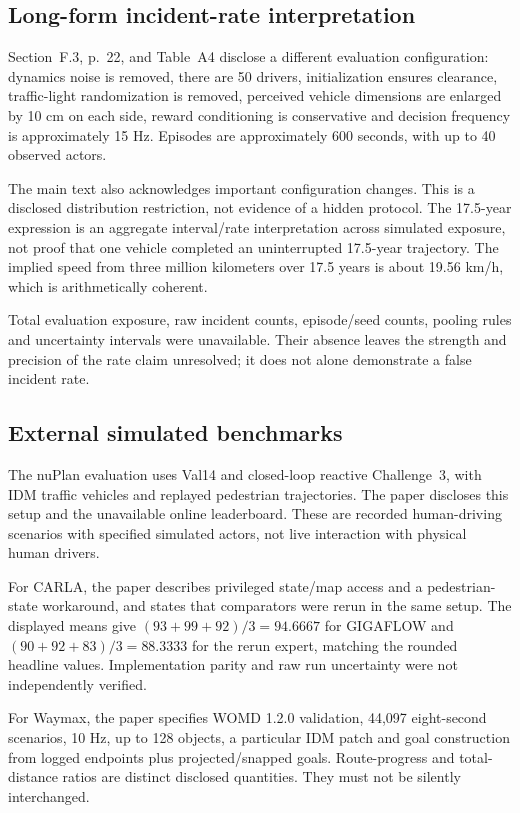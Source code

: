 \documentclass[10pt]{article}
\begin{document}
\subsection*{Long-form incident-rate interpretation}
Section F.3, p. 22, and Table A4 disclose a different evaluation configuration: dynamics noise is removed, there are 50 drivers, initialization ensures clearance, traffic-light randomization is removed, perceived vehicle dimensions are enlarged by 10 cm on each side, reward conditioning is conservative and decision frequency is approximately 15 Hz. Episodes are approximately 600 seconds, with up to 40 observed actors.\par
The main text also acknowledges important configuration changes. This is a disclosed distribution restriction, not evidence of a hidden protocol. The 17.5-year expression is an aggregate interval/rate interpretation across simulated exposure, not proof that one vehicle completed an uninterrupted 17.5-year trajectory. The implied speed from three million kilometers over 17.5 years is about 19.56 km/h, which is arithmetically coherent.\par
Total evaluation exposure, raw incident counts, episode/seed counts, pooling rules and uncertainty intervals were unavailable. Their absence leaves the strength and precision of the rate claim unresolved; it does not alone demonstrate a false incident rate.\par
\subsection*{External simulated benchmarks}
The nuPlan evaluation uses Val14 and closed-loop reactive Challenge 3, with IDM traffic vehicles and replayed pedestrian trajectories. The paper discloses this setup and the unavailable online leaderboard. These are recorded human-driving scenarios with specified simulated actors, not live interaction with physical human drivers.\par
For CARLA, the paper describes privileged state/map access and a pedestrian-state workaround, and states that comparators were rerun in the same setup. The displayed means give \((93+99+92)/3=94.6667\) for GIGAFLOW and \((90+92+83)/3=88.3333\) for the rerun expert, matching the rounded headline values. Implementation parity and raw run uncertainty were not independently verified.\par
For Waymax, the paper specifies WOMD 1.2.0 validation, 44,097 eight-second scenarios, 10 Hz, up to 128 objects, a particular IDM patch and goal construction from logged endpoints plus projected/snapped goals. Route-progress and total-distance ratios are distinct disclosed quantities. They must not be silently interchanged.\par
\end{document}
